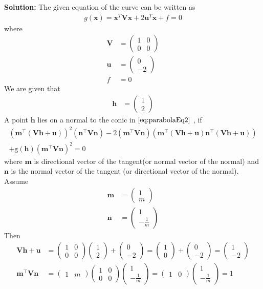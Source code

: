 \documentclass[12pt]{article}
\providecommand{\brak}[1]{\ensuremath{\left(#1\right)}}
\newcommand{\solution}{\noindent \textbf{Solution: }}
\newcommand{\myvec}[1]{\ensuremath{\begin{pmatrix}#1\end{pmatrix}}}
\let\vec\mathbf
\begin{document}
\begin{enumerate}
\solution 
The given equation of the curve can be written as  
\begin{align}
	\label{eq:parabolaEq2}
	g\brak{\vec{x}} = \vec{x}^T\vec{V}\vec{x} + 2\vec{u}^T\vec{x} + f = 0 
\end{align}
where
\begin{align}
	\label{eq:eqV}
	\vec{V} &= \myvec{ 1 & 0 \\ 0 & 0} \\
	\label{eq:eqU}
	\vec{u} &= \myvec{0 \\ -2} \\
	\label{eq:eqF}
	f &= 0 
\end{align}
We are given that 
\begin{align}
	\vec{h} &= \myvec{1 \\ 2}
\end{align}
A point $\vec{h}$ lies on a normal to the conic in $\eqref{eq:parabolaEq2}$ , if 
\begin{multline}
	\label{eq:point_of_tangency-m}
	\brak{ {\vec{m}^\top(\vec{Vh}+\vec{u})}}^2\brak{\vec{n}^{\top}\vec{V}\vec{n}} - 2\brak{\vec{m}^\top\vec{V}\vec{n}} \brak{ {\vec{m}^\top(\vec{Vh}+\vec{u})}\vec{n}^{\top}\brak{\vec{V}\vec{h}+\vec{u}}} 
	\\
+  \text{g}\brak{
  \vec{h}
	  }\brak{\vec{m}^\top\vec{V}\vec{n}}^2
	= 0
\end{multline}
where $\vec{m}$ is directional vector of the tangent(or normal vector of the normal) and $\vec{n}$ is the normal vector of the tangent (or directional vector of the normal). Assume 
\begin{align}
	\vec{m} &= \myvec{1  \\ m} \\
	\vec{n} &= \myvec{1  \\ -\frac{1}{m}}
\end{align}
Then
\begin{align}
	\vec{V}\vec{h} + \vec{u} &= \myvec{1 & 0\\ 0 & 0 }\myvec{1 \\ 2} + \myvec{0 \\ -2} = \myvec{1 \\ 0} + \myvec{0 \\ -2} = \myvec{1 \\ -2}\\	
	\vec{m}^\top\vec{V}\vec{n} &= \myvec{1 & m}\myvec{1 & 0 \\ 0 & 0}\myvec{1  \\ -\frac{1}{m}}=\myvec{1 & 0}\myvec{1  \\ -\frac{1}{m}} = 1 \\

\end{align}
\end{enumerate}
\end{document}
